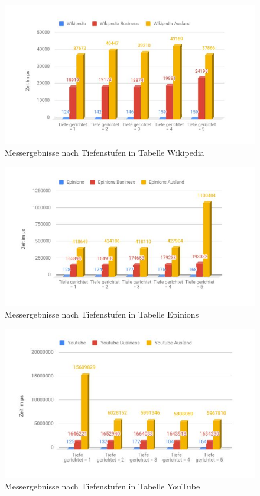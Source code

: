 \begin{figure}
\centering
\includegraphics[width=\textwidth]{images/wiki.jpg}
\caption{Messergebnisse nach Tiefenstufen in Tabelle Wikipedia}
\label{fig:wiki}
\end{figure}

\begin{figure}
	\centering
	\includegraphics[width=\textwidth]{images/epin.jpg}
	\caption{Messergebnisse nach Tiefenstufen in Tabelle Epinions}
	\label{fig:epin}
\end{figure}

\begin{figure}
	\centering
	\includegraphics[width=\textwidth]{images/youtub.jpg}
	\caption{Messergebnisse nach Tiefenstufen in Tabelle YouTube}
	\label{fig:youtub}
\end{figure}

